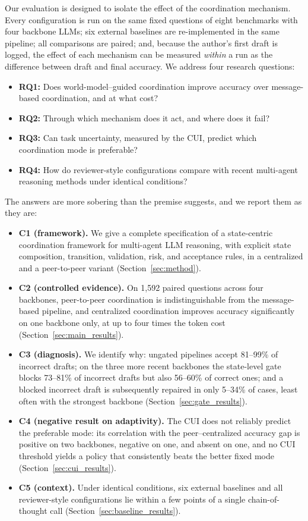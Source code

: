 \documentclass[lettersize,journal]{IEEEtran}
\begin{document}
Our evaluation is designed to isolate the effect of the coordination mechanism. Every configuration is run on the same fixed questions of eight benchmarks with four backbone LLMs; six external baselines are re-implemented in the same pipeline; all comparisons are paired; and, because the author's first draft is logged, the effect of each mechanism can be measured \emph{within} a run as the difference between draft and final accuracy.
We address four research questions:

\begin{itemize}
    \item \textbf{RQ1:} Does world-model--guided coordination improve accuracy over message-based coordination, and at what cost?
    \item \textbf{RQ2:} Through which mechanism does it act, and where does it fail?
    \item \textbf{RQ3:} Can task uncertainty, measured by the CUI, predict which coordination mode is preferable?
    \item \textbf{RQ4:} How do reviewer-style configurations compare with recent multi-agent reasoning methods under identical conditions?
\end{itemize}

The answers are more sobering than the premise suggests, and we report them as they are:

\begin{itemize}
    \item \textbf{C1 (framework).} We give a complete specification of a state-centric coordination framework for multi-agent LLM reasoning, with explicit state composition, transition, validation, risk, and acceptance rules, in a centralized and a peer-to-peer variant (Section~\ref{sec:method}).
    \item \textbf{C2 (controlled evidence).} On 1{,}592 paired questions across four backbones, peer-to-peer coordination is indistinguishable from the message-based pipeline, and centralized coordination improves accuracy significantly on one backbone only, at up to four times the token cost (Section~\ref{sec:main_results}).
    \item \textbf{C3 (diagnosis).} We identify why: ungated pipelines accept 81--99\% of incorrect drafts; on the three more recent backbones the state-level gate blocks 73--81\% of incorrect drafts but also 56--60\% of correct ones; and a blocked incorrect draft is subsequently repaired in only 5--34\% of cases, least often with the strongest backbone (Section~\ref{sec:gate_results}).
    \item \textbf{C4 (negative result on adaptivity).} The CUI does not reliably predict the preferable mode: its correlation with the peer--centralized accuracy gap is positive on two backbones, negative on one, and absent on one, and no CUI threshold yields a policy that consistently beats the better fixed mode (Section~\ref{sec:cui_results}).
    \item \textbf{C5 (context).} Under identical conditions, six external baselines and all reviewer-style configurations lie within a few points of a single chain-of-thought call (Section~\ref{sec:baseline_results}).
\end{itemize}
\end{document}
